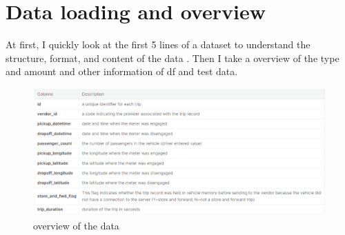 %


%
%
%
%
%



%
%

\section{Data loading and overview} \label{sec-Data loading and overview}

At first, I quickly look at the first 5 lines of a dataset to understand the structure,
format, and content of the data . Then I take a overview of the type and amount
and other information of df and test data.
\begin{figure}[h]
	\centering
	\includegraphics[scale=0.3]{overview.eps}
	\caption{overview of the data}
\end{figure}

